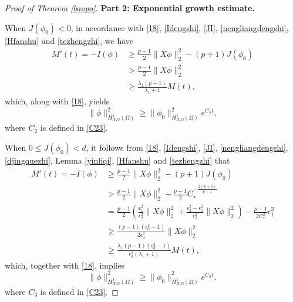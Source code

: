 \documentclass[11pt,a4paper]{article}
\numberwithin{equation}{section}
\newtheorem{remark}{Remark}[section]
\numberwithin{remark}{section}
\begin{document}
\begin{proof}[Proof of Theorem \ref{baopo}]
{\bf Part 2: Exponential growth estimate.}

When $J(\phi_0)<0$, in accordance with \eqref{18}, \eqref{Idengshi}, \eqref{JI}, \eqref{nengliangdengshi}, \eqref{Hfanshu} and \eqref{tezhengzhi}, we have
\begin{equation*}\begin{split}
M'(t)=-I(\phi)&\geq\frac{p-1}{2}\|X\phi\|_2^2-(p+1)J(\phi_0)\\
&>\frac{p-1}{2}\|X\phi\|_2^2\\
&\geq\frac{\lambda_1(p-1)}{\lambda_1+1}M(t),
\end{split}\end{equation*}
which, along with \eqref{18}, yields
\begin{equation*}
\|\phi\|_{H_{X,0}^1(\Omega)}^2\geq\|\phi_0\|_{H_{X,0}^1(\Omega)}^2e^{C_2t},
\end{equation*}
where $C_2$ is defined in \eqref{C23}.


When $0\leq J(\phi_0)<d$, it follows from \eqref{18}, \eqref{Idengshi}, \eqref{JI}, \eqref{nengliangdengshi}, \eqref{djingquezhi}, Lemma \ref{yinliqi}, \eqref{Hfanshu} and \eqref{tezhengzhi} that
\begin{equation*}\begin{split}
M'(t)=-I(\phi)&\geq\frac{p-1}{2}\|X\phi\|_2^2-(p+1)J(\phi_0)\\
&>\frac{p-1}{2}\|X\phi\|_2^2-\frac{p-1}{2}C_*^{-\frac{2(p+1)}{p-1}}\\
&=\frac{p-1}{2}\left(\frac{\epsilon_1^2}{\epsilon_2^2}\|X\phi\|_2^2+\frac{\epsilon_2^2-\epsilon_1^2}{\epsilon_2^2}\|X\phi\|_2^2\right)
-\frac{p-1}{2C_*^2}\epsilon_1^2\\
&\geq\frac{(p-1)\left(\epsilon_0^2-1\right)}{2\epsilon_0^2}\|X\phi\|_2^2\\
&\geq\frac{\lambda_1(p-1)\left(\epsilon_0^2-1\right)}{\epsilon_0^2(\lambda_1+1)}M(t),
\end{split}\end{equation*}
which, together with \eqref{18}, implies
\begin{equation*}
\|\phi\|_{H_{X,0}^1(\Omega)}^2\geq\|\phi_0\|_{H_{X,0}^1(\Omega)}^2e^{C_3t},
\end{equation*}
where $C_3$ is defined in \eqref{C23}.
\end{proof}









\end{document}
